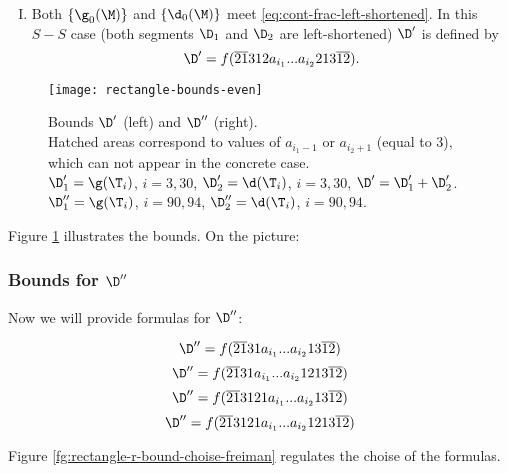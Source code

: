 \begin{enumerate}[I.]
	\item Both $\{\g_0(\M)\}$ and $\{\d_0(\M)\}$
	meet \ref{eq:cont-frac-left-shortened}.
	In this $S-S$ case
	(both segments $\D_1$ and $\D_2$ are left-shortened)
	$\D'$ is defined by
	\begin{equation}
		\D' = f(\overline{21}312a_{i_1}... a_{i_2}213\overline{12}).
	\end{equation}
\end{enumerate}

\begin{figure}[p]
	\centering
	\texttt{[image: rectangle-bounds-even]}
	\caption{
		Bounds $\D'$ (left) and $\D''$ (right).\\
		Hatched areas correspond to values of $a_{i_1 - 1}$ or $a_{i_2 + 1}$ (equal to 3),
		which can not appear in the concrete case. \\
		$\D_1' = \g(\T_i)$, $i=3,30$,
		$\D_2' = \d  (\T_i)$, $i=3,30$,
		$\D' = \D_1' + \D_2'$. \\
		$\D_1'' = \g(\T_i)$, $i = 90, 94$,
		$\D_2'' = \d  (\T_i)$, $i = 90, 94$.
	}
	\label{fg:rectangle-bounds-even}
\end{figure}

Figure \ref{fg:rectangle-bounds-even} illustrates the bounds. On the picture:

\subsubsection{Bounds for $\D''$}
Now we will provide formulas for $\D''$:

\begin{equation}\label{eq:bound-r-nnn}
	\D'' = f(\overline{21}31a_{i_1}... a_{i_2}13\overline{12})
\end{equation}
\begin{equation}\label{eq:bound-r-nns-ns}
	\D'' = f(\overline{21}31a_{i_1}... a_{i_2}1213\overline{12})
\end{equation}
\begin{equation}\label{eq:bound-r-ns}
	\D'' = f(\overline{21}3121a_{i_1}... a_{i_2}13\overline{12})
\end{equation}
\begin{equation}\label{eq:bound-r-sn}
	\D'' = f(\overline{21}3121a_{i_1}... a_{i_2}1213\overline{12})
\end{equation}

Figure \ref{fg:rectangle-r-bound-choise-freiman} regulates the choise of the formulas.

